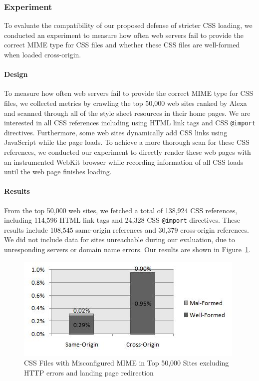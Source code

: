 \documentclass{acm_proc_article-sp}
\begin{document}
\subsubsection{Experiment}
To evaluate the compatibility of our proposed defense of stricter CSS loading, we conducted an experiment to measure how often web servers fail to provide the correct MIME type for CSS files and whether these CSS files are well-formed when loaded cross-origin.

\paragraph{Design}
To measure how often web servers fail to provide the correct MIME type for CSS files, we collected metrics by crawling the top 50,000 web sites ranked by Alexa~\cite{alexa} and scanned through all of the style sheet resources in their home pages. We are interested in all CSS references including using HTML link tags and CSS \texttt{@import} directives. Furthermore, some web sites dynamically add CSS links using JavaScript while the page loads. To achieve a more thorough scan for these CSS references, we conducted our experiment to directly render these web pages with an instrumented WebKit browser while recording information of all CSS loads until the web page finishes loading.

\paragraph{Results}
From the top 50,000 web sites, we fetched a total of 138,924 CSS references, including 114,596 HTML link tags and 24,328 CSS \texttt{@import} directives. These results include 108,545 same-origin references and 30,379 cross-origin references. We did not include data for sites unreachable during our evaluation, due to unresponding servers or domain name errors. Our results are shown in Figure~\ref{figure:MIME}.

\begin{figure}
\centering
\includegraphics[width=\linewidth]{mime.jpg}
\caption{CSS Files with Misconfigured MIME in Top 50,000 Sites excluding HTTP errors and landing page redirection}
\label{figure:MIME}
\end{figure}
\end{document}
